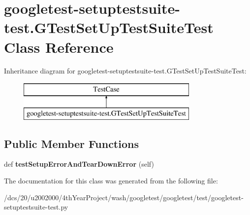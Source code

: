 \hypertarget{classgoogletest-setuptestsuite-test_1_1GTestSetUpTestSuiteTest}{}\section{googletest-\/setuptestsuite-\/test.G\+Test\+Set\+Up\+Test\+Suite\+Test Class Reference}
\label{classgoogletest-setuptestsuite-test_1_1GTestSetUpTestSuiteTest}
Inheritance diagram for googletest-\/setuptestsuite-\/test.G\+Test\+Set\+Up\+Test\+Suite\+Test\+:\begin{figure}[H]
\begin{center}
\leavevmode
\includegraphics[height=2.000000cm]{classgoogletest-setuptestsuite-test_1_1GTestSetUpTestSuiteTest}
\end{center}
\end{figure}
\subsection*{Public Member Functions}
\begin{DoxyCompactItemize}
\item 
\mbox{\label{classgoogletest-setuptestsuite-test_1_1GTestSetUpTestSuiteTest_ae24cfd8f6b08cbf363dbb8a43defe5e4}} 
def {\bfseries test\+Setup\+Error\+And\+Tear\+Down\+Error} (self)
\end{DoxyCompactItemize}


The documentation for this class was generated from the following file\+:\begin{DoxyCompactItemize}
\item 
/dcs/20/u2002000/4th\+Year\+Project/wash/googletest/googletest/test/googletest-\/setuptestsuite-\/test.\+py\end{DoxyCompactItemize}

